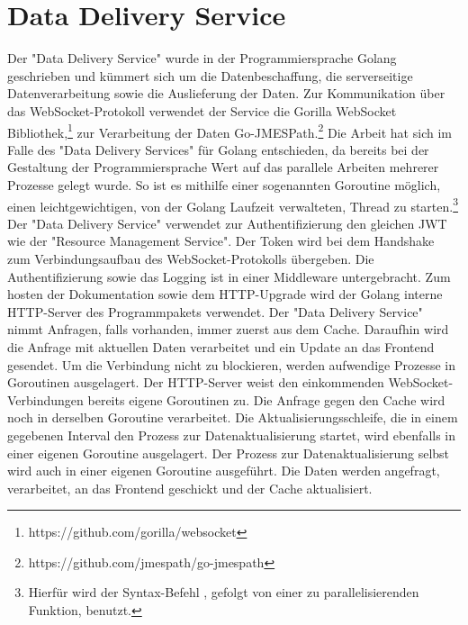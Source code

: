 \section{Data Delivery Service}
\label{sec:datadeliveryservice}
Der "Data Delivery Service" wurde in der Programmiersprache Golang geschrieben und kümmert sich um die Datenbeschaffung,
die serverseitige Datenverarbeitung sowie die Auslieferung der Daten. Zur Kommunikation über das WebSocket-Protokoll
verwendet der Service die Gorilla WebSocket Bibliothek,\footnote{https://github.com/gorilla/websocket} zur Verarbeitung
der Daten Go-JMESPath.\footnote{https://github.com/jmespath/go-jmespath} Die Arbeit hat sich im Falle des
"Data Delivery Services" für Golang entschieden, da bereits bei der Gestaltung der Programmiersprache Wert auf
das parallele Arbeiten mehrerer Prozesse gelegt wurde. So ist es mithilfe einer sogenannten Goroutine möglich,
einen leichtgewichtigen, von der Golang Laufzeit verwalteten, Thread zu starten.\footnote{Hierfür
wird der Syntax-Befehl , gefolgt von einer zu parallelisierenden Funktion, benutzt.\cite{GoroutinesExample}}
Der "Data Delivery Service" verwendet zur Authentifizierung den gleichen JWT wie der "Resource Management Service".
Der Token wird bei dem Handshake zum Verbindungsaufbau des WebSocket-Protokolls übergeben. Die Authentifizierung
sowie das Logging ist in einer Middleware untergebracht. Zum hosten der Dokumentation sowie dem HTTP-Upgrade
wird der Golang interne HTTP-Server des  Programmpakets verwendet. Der "Data Delivery Service"
nimmt Anfragen, falls vorhanden, immer zuerst aus dem Cache. Daraufhin wird die Anfrage mit aktuellen Daten
verarbeitet und ein Update an das Frontend gesendet. Um die Verbindung nicht zu blockieren, werden aufwendige
Prozesse in Goroutinen ausgelagert. Der HTTP-Server weist den einkommenden WebSocket-Verbindungen bereits
eigene Goroutinen zu. Die Anfrage gegen den Cache wird noch in derselben Goroutine verarbeitet.
Die Aktualisierungsschleife, die in einem gegebenen Interval den Prozess zur Datenaktualisierung startet,
wird ebenfalls in einer eigenen Goroutine ausgelagert. Der Prozess zur Datenaktualisierung selbst wird
auch in einer eigenen Goroutine ausgeführt. Die Daten werden angefragt, verarbeitet, an das Frontend geschickt
und der Cache aktualisiert.
